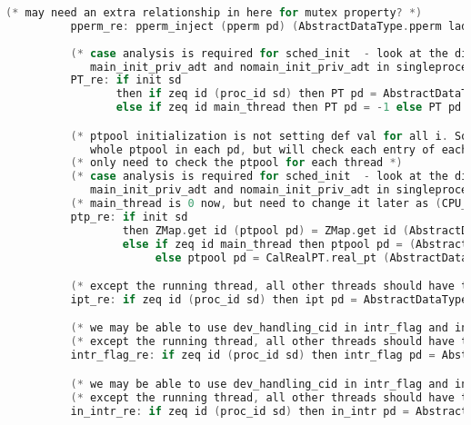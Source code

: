 \begin{lstlisting}[language=C]
          (* may need an extra relationship in here for mutex property? *)
          pperm_re: pperm_inject (pperm pd) (AbstractDataType.pperm ladt);
          
          (* case analysis is required for sched_init  - look at the difference between 
             main_init_priv_adt and nomain_init_priv_adt in singleprocessor/AuxSingleAbstractData.v file *)
          PT_re: if init sd 
                 then if zeq id (proc_id sd) then PT pd = AbstractDataType.PT ladt else PT pd = 0
                 else if zeq id main_thread then PT pd = -1 else PT pd = 0;

          (* ptpool initialization is not setting def val for all i. So I will keep the 
             whole ptpool in each pd, but will check each entry of each thread's ptpool for simulation *)
          (* only need to check the ptpool for each thread *)
          (* case analysis is required for sched_init  - look at the difference between 
             main_init_priv_adt and nomain_init_priv_adt in singleprocessor/AuxSingleAbstractData.v file *)
          (* main_thread is 0 now, but need to change it later as (CPU_ID adt) + 1 *)
          ptp_re: if init sd 
                  then ZMap.get id (ptpool pd) = ZMap.get id (AbstractDataType.ptpool ladt)
                  else if zeq id main_thread then ptpool pd = (AbstractDataType.ptpool ladt) 
                       else ptpool pd = CalRealPT.real_pt (AbstractDataType.ptpool ladt);

          (* except the running thread, all other threads should have the default value  - necessary for yield and sleep case *)
          ipt_re: if zeq id (proc_id sd) then ipt pd = AbstractDataType.ipt ladt else ipt pd = true;

          (* we may be able to use dev_handling_cid in intr_flag and in_intr too. But, the current version may be fine now *)
          (* except the running thread, all other threads should have the default value - necessary for yield and sleep case *)
          intr_flag_re: if zeq id (proc_id sd) then intr_flag pd = AbstractDataType.intr_flag ladt else intr_flag pd = true;

          (* we may be able to use dev_handling_cid in intr_flag and in_intr too. But, the current version may be fine now *)
          (* except the running thread, all other threads should have the default value - necessary for yield and sleep case *)          
          in_intr_re: if zeq id (proc_id sd) then in_intr pd = AbstractDataType.in_intr ladt else in_intr pd = false;


\end{lstlisting}
